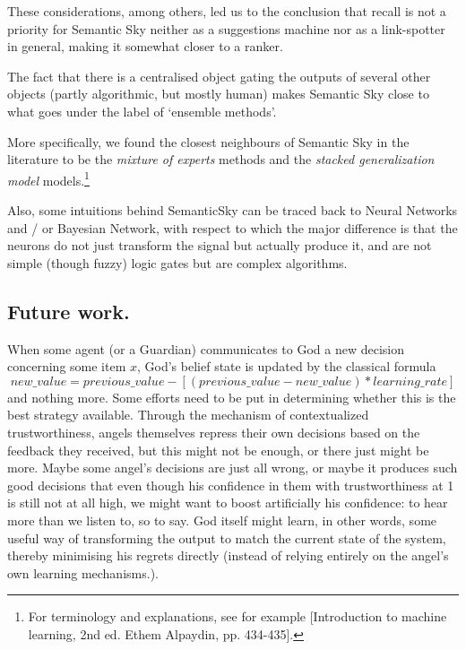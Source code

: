 \documentclass[11pt]{article}
\begin{document}
These considerations, among others, led us to the conclusion that recall is not a priority for Semantic Sky neither as a suggestions machine nor as a link-spotter in general, making it somewhat closer to a ranker.

The fact that there is a centralised object gating the outputs of several other objects (partly algorithmic, but mostly human) makes Semantic Sky close to what goes under the label of `ensemble methods'.

More specifically, we found the closest neighbours of Semantic Sky in the literature to be the \emph{mixture of experts} methods and the \emph{stacked generalization model} models.\footnote{For terminology and explanations, see for example [Introduction to machine learning, 2nd ed. Ethem Alpaydin, pp. 434-435].}

Also, some intuitions behind SemanticSky can be traced back to Neural Networks and / or Bayesian Network, with respect to which the major difference is that the neurons do not just transform the signal but actually produce it, and are not simple (though fuzzy) logic gates but are complex algorithms.

\subsection{Future work.}

When some agent (or a Guardian) communicates to God a new decision concerning some item $x$, God's belief state is updated by the classical formula 
\[new\_value = previous\_value - [(previous\_value - new\_value) * learning\_rate] \]
and nothing more. Some efforts need to be put in determining whether this is the best strategy available. Through the mechanism of contextualized trustworthiness, angels themselves repress their own decisions based on the feedback they received, but this might not be enough, or there just might be more. Maybe some angel's decisions are just all wrong, or maybe it produces such good decisions that even though his confidence in them with trustworthiness at 1 is still not at all high, we might want to boost artificially his confidence: to hear more than we listen to, so to say. God itself might learn, in other words, some useful way of transforming the output to match the current state of the system, thereby minimising his regrets directly (instead of relying entirely on the angel's own learning mechanisms.).

\end{document}
